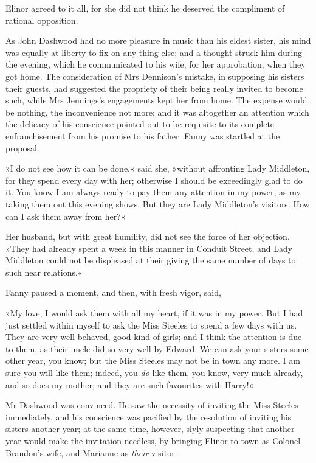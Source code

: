 Elinor agreed to it all, for she did not think he deserved the compliment of rational opposition.

As John Dashwood had no more pleasure in music than his eldest sister, his mind was equally at liberty to fix on any thing else; and a thought struck him during the evening, which he communicated to his wife, for her approbation, when they got home. The consideration of Mrs Dennison’s mistake, in supposing his sisters their guests, had suggested the propriety of their being really invited to become such, while Mrs Jennings’s engagements kept her from home. The expense would be nothing, the inconvenience not more; and it was altogether an attention which the delicacy of his conscience pointed out to be requisite to its complete enfranchisement from his promise to his father. Fanny was startled at the proposal.

»I do not see how it can be done,« said she, »without affronting Lady Middleton, for they spend every day with her; otherwise I should be exceedingly glad to do it. You know I am always ready to pay them any attention in my power, as my taking them out this evening shows. But they are Lady Middleton’s visitors. How can I ask them away from her?«

Her husband, but with great humility, did not see the force of her objection. »They had already spent a week in this manner in Conduit Street, and Lady Middleton could not be displeased at their giving the same number of days to such near relations.«

Fanny paused a moment, and then, with fresh vigor, said,

»My love, I would ask them with all my heart, if it was in my power. But I had just settled within myself to ask the Miss Steeles to spend a few days with us. They are very well behaved, good kind of girls; and I think the attention is due to them, as their uncle did so very well by Edward. We can ask your sisters some other year, you know; but the Miss Steeles may not be in town any more. I am sure you will like them; indeed, you \textit{do} like them, you know, very much already, and so does my mother; and they are such favourites with Harry!«

Mr Dashwood was convinced. He saw the necessity of inviting the Miss Steeles immediately, and his conscience was pacified by the resolution of inviting his sisters another year; at the same time, however, slyly suspecting that another year would make the invitation needless, by bringing Elinor to town as Colonel Brandon’s wife, and Marianne as \textit{their} visitor.

